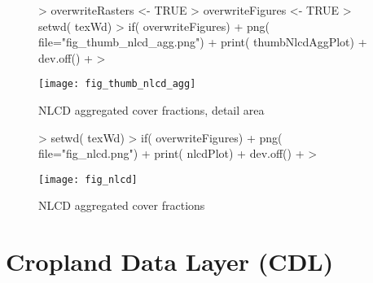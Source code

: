 \begin{figure} 
\begin{center}
  
\begin{Schunk}
\begin{Sinput}
> overwriteRasters <- TRUE
> overwriteFigures <- TRUE
> setwd( texWd)
> if( overwriteFigures) {
+   png( file="fig_thumb_nlcd_agg.png")
+   print( thumbNlcdAggPlot)
+   dev.off()
+ }
> 
\end{Sinput}
\end{Schunk}


\texttt{[image: fig\_thumb\_nlcd\_agg]}
\end{center} 
\caption{NLCD aggregated cover fractions, detail area}
\label{fig:thumb_nlcd_agg}
\end{figure} 



\begin{Schunk}
\end{Schunk}

\begin{figure} 
\begin{center}
  
\begin{Schunk}
\begin{Sinput}
> setwd( texWd)
> if( overwriteFigures) {
+   png( file="fig_nlcd.png")
+   print( nlcdPlot)
+   dev.off()
+ }
> 
\end{Sinput}
\end{Schunk}


\texttt{[image: fig\_nlcd]}
\end{center} 
\caption{NLCD aggregated cover fractions}
\label{fig:nlcd}
\end{figure} 

\section{Cropland Data Layer (CDL)}
\label{sec:cdl}

